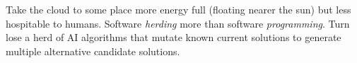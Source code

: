 \documentclass[journal]{IEEEtran}
\begin{document}
Take the cloud to some place more energy full (floating nearer the sun) but less hospitable to humans. Software {\em herding} more
than software {\em programming}. Turn lose a herd of AI algorithms
that mutate known current solutions to generate multiple
alternative candidate solutions.


%
%



%
%
\end{document}
